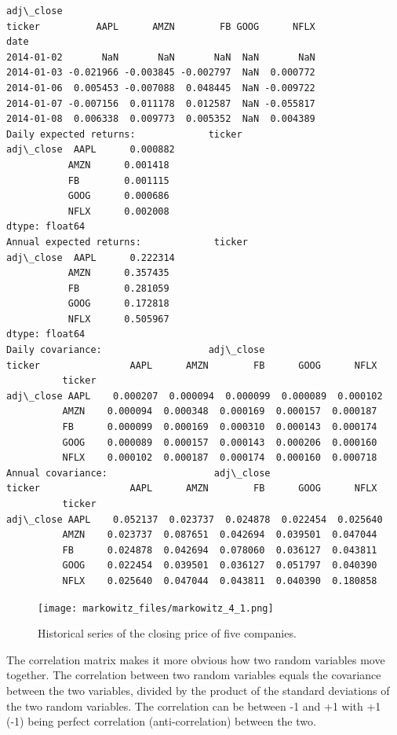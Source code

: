 \begin{tcolorbox}[breakable, size=fbox, boxrule=1pt, pad at break*=1mm,colback=cellbackground, colframe=cellborder]
\begin{Verbatim}[commandchars=\\\{\}]
           adj\_close
ticker          AAPL      AMZN        FB GOOG      NFLX
date
2014-01-02       NaN       NaN       NaN  NaN       NaN
2014-01-03 -0.021966 -0.003845 -0.002797  NaN  0.000772
2014-01-06  0.005453 -0.007088  0.048445  NaN -0.009722
2014-01-07 -0.007156  0.011178  0.012587  NaN -0.055817
2014-01-08  0.006338  0.009773  0.005352  NaN  0.004389
Daily expected returns:             ticker
adj\_close  AAPL      0.000882
           AMZN      0.001418
           FB        0.001115
           GOOG      0.000686
           NFLX      0.002008
dtype: float64
Annual expected returns:             ticker
adj\_close  AAPL      0.222314
           AMZN      0.357435
           FB        0.281059
           GOOG      0.172818
           NFLX      0.505967
dtype: float64
Daily covariance:                   adj\_close
ticker                AAPL      AMZN        FB      GOOG      NFLX
          ticker
adj\_close AAPL    0.000207  0.000094  0.000099  0.000089  0.000102
          AMZN    0.000094  0.000348  0.000169  0.000157  0.000187
          FB      0.000099  0.000169  0.000310  0.000143  0.000174
          GOOG    0.000089  0.000157  0.000143  0.000206  0.000160
          NFLX    0.000102  0.000187  0.000174  0.000160  0.000718
Annual covariance:                   adj\_close
ticker                AAPL      AMZN        FB      GOOG      NFLX
          ticker
adj\_close AAPL    0.052137  0.023737  0.024878  0.022454  0.025640
          AMZN    0.023737  0.087651  0.042694  0.039501  0.047044
          FB      0.024878  0.042694  0.078060  0.036127  0.043811
          GOOG    0.022454  0.039501  0.036127  0.051797  0.040390
          NFLX    0.025640  0.047044  0.043811  0.040390  0.180858
    \end{Verbatim}
\end{tcolorbox}

    \begin{figure}
    \centering
    \texttt{[image: markowitz\_files/markowitz\_4\_1.png]}
    \caption{Historical series of the closing price of five companies.}
    \label{fig:stocks}
    \end{figure}
    
    The correlation matrix makes it more obvious how two random variables
move together. The correlation between two random variables equals the
covariance between the two variables, divided by the product of the
standard deviations of the two random variables. The correlation can be
between -1 and +1 with +1 (-1) being perfect correlation
(anti-correlation) between the two.

